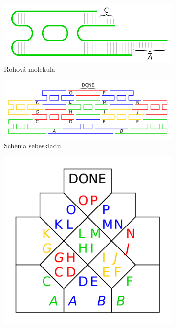 \documentclass[10pt]{beamer}
\theoremstyle{definition}
\theoremstyle{remark}
\begin{document}
\begin{frame}
	\begin{figure}[H]
	\begin{center}
		\begin{subfigure}[b]{0.33\textwidth}
			\includegraphics[width=\textwidth]{../figures/tile_model/DNA_struct.pdf} %
			\caption{Rohová molekula}
		\end{subfigure}
		\begin{subfigure}[b]{0.65\textwidth}
			\includegraphics[width=\textwidth]{../figures/tile_model/DNA_assembly.pdf} %
			\caption{Schéma sebeskladu}
		\end{subfigure}
		\begin{subfigure}[b]{0.25\textwidth}
			\includegraphics[width=\textwidth]{../figures/tile_model/abstract_model.pdf} %

\end{subfigure}
\end{center}
\end{figure}
\end{frame}
\end{document}
